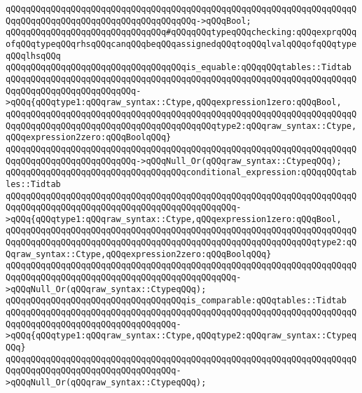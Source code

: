 \verb|qQQqqQQqqQQqqQQqqQQqqQQqqQQqqQQqqQQqqQQqqQQqqQQqqQQqqQQqqQQqqQQqqQQqqQQqqQQqqQQqqQQqqQQqqQQqqQQqqQQqqQQqqQQq->qQQqBool;|\newline
\verb|qQQqqQQqqQQqqQQqqQQqqQQqqQQqqQQq#qQQqqQQqtypeqQQqchecking:qQQqexprqQQqofqQQqtypeqQQqrhsqQQqcanqQQqbeqQQqassignedqQQqtoqQQqlvalqQQqofqQQqtypeqQQqlhsqQQq|\newline
\newline
\verb|qQQqqQQqqQQqqQQqqQQqqQQqqQQqqQQqqQQqis_equable:qQQqqQQqtables::Tidtab|\newline
\verb|qQQqqQQqqQQqqQQqqQQqqQQqqQQqqQQqqQQqqQQqqQQqqQQqqQQqqQQqqQQqqQQqqQQqqQQqqQQqqQQqqQQqqQQqqQQqqQQq->qQQq{qQQqtype1:qQQqraw_syntax::Ctype,qQQqexpression1zero:qQQqBool,|\newline
\verb|qQQqqQQqqQQqqQQqqQQqqQQqqQQqqQQqqQQqqQQqqQQqqQQqqQQqqQQqqQQqqQQqqQQqqQQqqQQqqQQqqQQqqQQqqQQqqQQqqQQqqQQqqQQqqQQqtype2:qQQqraw_syntax::Ctype,qQQqexpression2zero:qQQqBoolqQQq}|\newline
\verb|qQQqqQQqqQQqqQQqqQQqqQQqqQQqqQQqqQQqqQQqqQQqqQQqqQQqqQQqqQQqqQQqqQQqqQQqqQQqqQQqqQQqqQQqqQQqqQQq->qQQqNull_Or(qQQqraw_syntax::CtypeqQQq);|\newline
\newline
\verb|qQQqqQQqqQQqqQQqqQQqqQQqqQQqqQQqqQQqconditional_expression:qQQqqQQqtables::Tidtab|\newline
\verb|qQQqqQQqqQQqqQQqqQQqqQQqqQQqqQQqqQQqqQQqqQQqqQQqqQQqqQQqqQQqqQQqqQQqqQQqqQQqqQQqqQQqqQQqqQQqqQQqqQQqqQQqqQQqqQQqqQQq->qQQq{qQQqtype1:qQQqraw_syntax::Ctype,qQQqexpression1zero:qQQqBool,|\newline
\verb|qQQqqQQqqQQqqQQqqQQqqQQqqQQqqQQqqQQqqQQqqQQqqQQqqQQqqQQqqQQqqQQqqQQqqQQqqQQqqQQqqQQqqQQqqQQqqQQqqQQqqQQqqQQqqQQqqQQqqQQqqQQqqQQqqQQqtype2:qQQqraw_syntax::Ctype,qQQqexpression2zero:qQQqBoolqQQq}|\newline
\verb|qQQqqQQqqQQqqQQqqQQqqQQqqQQqqQQqqQQqqQQqqQQqqQQqqQQqqQQqqQQqqQQqqQQqqQQqqQQqqQQqqQQqqQQqqQQqqQQqqQQqqQQqqQQqqQQqqQQq->qQQqNull_Or(qQQqraw_syntax::CtypeqQQq);|\newline
\newline
\verb|qQQqqQQqqQQqqQQqqQQqqQQqqQQqqQQqqQQqis_comparable:qQQqtables::Tidtab|\newline
\verb|qQQqqQQqqQQqqQQqqQQqqQQqqQQqqQQqqQQqqQQqqQQqqQQqqQQqqQQqqQQqqQQqqQQqqQQqqQQqqQQqqQQqqQQqqQQqqQQqqQQqqQQq->qQQq{qQQqtype1:qQQqraw_syntax::Ctype,qQQqtype2:qQQqraw_syntax::CtypeqQQq}|\newline
\verb|qQQqqQQqqQQqqQQqqQQqqQQqqQQqqQQqqQQqqQQqqQQqqQQqqQQqqQQqqQQqqQQqqQQqqQQqqQQqqQQqqQQqqQQqqQQqqQQqqQQqqQQq->qQQqNull_Or(qQQqraw_syntax::CtypeqQQq);|\newline
